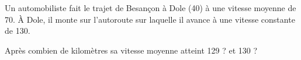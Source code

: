 
\begin{exercice}\label{exosmath-0377}

    Un automobiliste fait le trajet de Besançon à Dole (\unit{40}{\kilo\meter}) à une vitesse moyenne de \unit{70}{\kilo\meter\per\hour}. À Dole, il monte sur l'autoroute sur laquelle il avance à une vitesse constante de \unit{130}{\kilo\meter\per\hour}.

    Après combien de kilomètres sa vitesse moyenne atteint \unit{129}{\kilo\meter\per\hour} ? et \unit{130}{\kilo\meter\per\hour} ?

\end{exercice}
